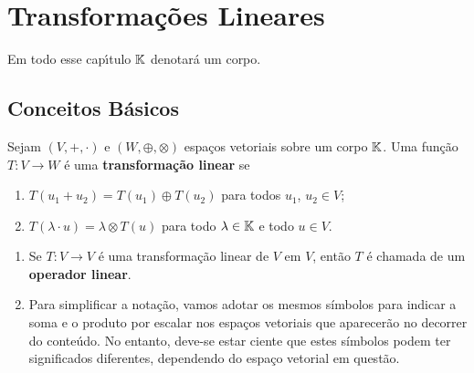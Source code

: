 
\chapter{Transforma\c{c}\~oes Lineares}

Em todo esse cap{\'\i}tulo $\mathbb{K}$ denotar\'a um corpo.

\section{Conceitos B\'asicos}

\begin{definicao}
  Sejam $(V, +, \cdot)$ e $(W, \oplus, \otimes)$ espa\c{c}os vetoriais sobre um corpo $\mathbb{K}$. Uma fun\c{c}\~ao $T \colon V \to W$ \'e uma \textbf{transforma\c{c}\~ao linear} se
  \begin{enumerate}[label={\roman*})]
    \item $T(u_1 + u_2) = T(u_1) \oplus T(u_2)$ para todos $u_1$, $u_2 \in V$;
    \item $T(\lambda \cdot u) = \lambda \otimes T(u)$ para todo $\lambda \in \mathbb{K}$ e todo $u \in V$.
  \end{enumerate}
\end{definicao}

\begin{observacoes}
    \begin{enumerate}[label={\roman*})]
        \item Se $T \colon V \to V$ é uma transformação linear de $V$ em $V$, então $T$ é chamada de um \textbf{operador linear}.

        \item Para simplificar a notação, vamos adotar os mesmos símbolos para indicar a soma e o produto por escalar nos espaços vetoriais que aparecerão no decorrer do conteúdo. No entanto, deve-se estar ciente que estes símbolos podem ter significados diferentes, dependendo do espaço vetorial em questão.
    \end{enumerate}
\end{observacoes}

